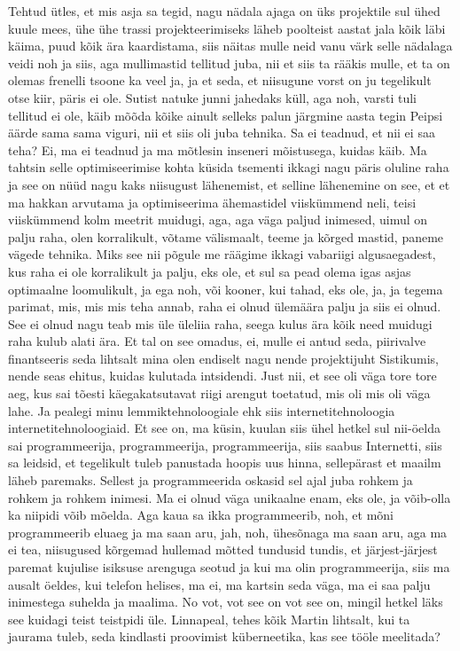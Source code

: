 Tehtud ütles, et mis asja sa tegid, nagu nädala ajaga on üks projektile sul ühed kuule mees, ühe ühe trassi projekteerimiseks läheb poolteist aastat jala kõik läbi käima, puud kõik ära kaardistama, siis näitas mulle neid vanu värk selle nädalaga veidi noh ja siis, aga mullimastid tellitud juba, nii et siis ta rääkis mulle, et ta on olemas frenelli tsoone ka veel ja, ja et seda, et niisugune vorst on ju tegelikult otse kiir, päris ei ole. Sutist natuke junni jahedaks küll, aga noh, varsti tuli tellitud ei ole, käib mõõda kõike ainult selleks palun järgmine aasta tegin Peipsi äärde sama sama viguri, nii et siis oli juba tehnika. Sa ei teadnud, et nii ei saa teha? Ei, ma ei teadnud ja ma mõtlesin inseneri mõistusega, kuidas käib. Ma tahtsin selle optimiseerimise kohta küsida tsementi ikkagi nagu päris oluline raha ja see on nüüd nagu kaks niisugust lähenemist, et selline lähenemine on see, et et ma hakkan arvutama ja optimiseerima ähemastidel viiskümmend neli, teisi viiskümmend kolm meetrit muidugi, aga, aga väga paljud inimesed, uimul on palju raha, olen korralikult, võtame välismaalt, teeme ja kõrged mastid, paneme vägede tehnika. Miks see nii põgule me räägime ikkagi vabariigi algusaegadest, kus raha ei ole korralikult ja palju, eks ole, et sul sa pead olema igas asjas optimaalne loomulikult, ja ega noh, või kooner, kui tahad, eks ole, ja, ja tegema parimat, mis, mis mis teha annab, raha ei olnud ülemäära palju ja siis ei olnud. See ei olnud nagu teab mis üle üleliia raha, seega kulus ära kõik need muidugi raha kulub alati ära. Et tal on see omadus, ei, mulle ei antud seda, piirivalve finantseeris seda lihtsalt mina olen endiselt nagu nende projektijuht Sistikumis, nende seas ehitus, kuidas kulutada intsidendi. Just nii, et see oli väga tore tore aeg, kus sai tõesti käegakatsutavat riigi arengut toetatud, mis oli mis oli väga lahe. Ja pealegi minu lemmiktehnoloogiale ehk siis internetitehnoloogia internetitehnoloogiaid. Et see on, ma küsin, kuulan siis ühel hetkel sul nii-öelda sai programmeerija, programmeerija, programmeerija, siis saabus Internetti, siis sa leidsid, et tegelikult tuleb panustada hoopis uus hinna, sellepärast et maailm läheb paremaks. Sellest ja programmeerida oskasid sel ajal juba rohkem ja rohkem ja rohkem inimesi. Ma ei olnud väga unikaalne enam, eks ole, ja võib-olla ka niipidi võib mõelda. Aga kaua sa ikka programmeerib, noh, et mõni programmeerib eluaeg ja ma saan aru, jah, noh, ühesõnaga ma saan aru, aga ma ei tea, niisugused kõrgemad hullemad mõtted tundusid tundis, et järjest-järjest paremat kujulise isiksuse arenguga seotud ja kui ma olin programmeerija, siis ma ausalt öeldes, kui telefon helises, ma ei, ma kartsin seda väga, ma ei saa palju inimestega suhelda ja maalima. No vot, vot see on vot see on, mingil hetkel läks see kuidagi teist teistpidi üle. Linnapeal, tehes kõik Martin lihtsalt, kui ta jaurama tuleb, seda kindlasti proovimist küberneetika, kas see tööle meelitada?
